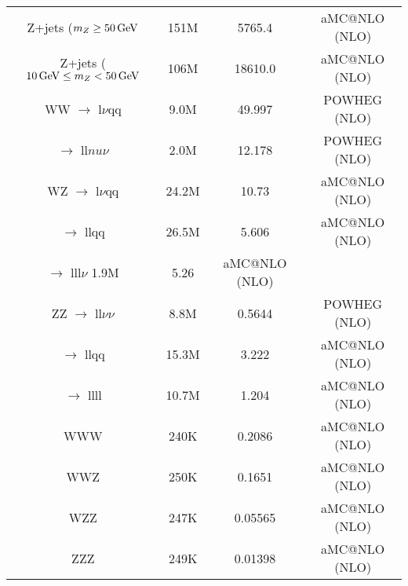 \begin{table}[htbp]
{\begin{tabular}{cccc}
   \hline
   Z+jets ($m_{Z} \geq 50\,\text{Ge\hspace{-.08em}V} $ & 151M & 5765.4 & aMC@NLO (NLO) \\
   Z+jets ($10 \,\text{Ge\hspace{-.08em}V} \leq m_{Z} < 50\,\text{Ge\hspace{-.08em}V}$ & 106M & 18610.0 & aMC@NLO (NLO) \\
   \hline
   WW $\rightarrow$ l$\nu$qq & 9.0M & 49.997  & POWHEG (NLO) \\
      $\rightarrow$ ll$nu\nu$ & 2.0M & 12.178 & POWHEG (NLO) \\
   \hline
   WZ $\rightarrow$ l$\nu$qq & 24.2M & 10.73 & aMC@NLO (NLO) \\
      $\rightarrow$ llqq & 26.5M & 5.606 & aMC@NLO (NLO) \\
      $\rightarrow$ lll$\nu$ 1.9M & 5.26 & aMC@NLO (NLO) \\
   \hline
   ZZ $\rightarrow$ ll$\nu\nu$ & 8.8M & 0.5644 & POWHEG (NLO) \\
      $\rightarrow$ llqq & 15.3M & 3.222 & aMC@NLO (NLO) \\
      $\rightarrow$ llll & 10.7M & 1.204 & aMC@NLO (NLO) \\
   \hline
   WWW & 240K & 0.2086 & aMC@NLO (NLO) \\
   \hline
   WWZ & 250K & 0.1651 & aMC@NLO (NLO) \\
   \hline
   WZZ & 247K & 0.05565 & aMC@NLO (NLO) \\
   \hline
   ZZZ & 249K & 0.01398 & aMC@NLO (NLO) \\
   \hline
   
 \end{tabular}}
\end{table}


